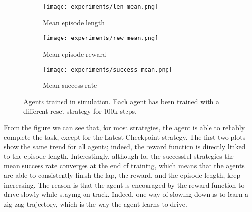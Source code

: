 \begin{figure}[h]
  \centering
  \begin{subfigure}{.45\linewidth}
      \centering
      \texttt{[image: experiments/len\_mean.png]}
      \caption{Mean episode length}\label{fig:len}
  \end{subfigure}%
      \hfill
  \begin{subfigure}{.45\linewidth}
      \centering
      \texttt{[image: experiments/rew\_mean.png]}
      \caption{Mean episode reward}\label{fig:rew}
  \end{subfigure}
  
  \bigskip
  \begin{subfigure}{.45\linewidth}
    \centering
    \texttt{[image: experiments/success\_mean.png]}
    \caption{Mean success rate}\label{fig:succ}
  \end{subfigure} 
  \caption{Agents trained in simulation. Each agent has been trained with a different reset strategy for 100k steps.}
  \label{fig:agentresults}
\end{figure}


From the figure we can see that, for most strategies, the agent is able to reliably complete the task, except for the Latest Checkpoint strategy. The first two plots show the same trend for all agents; indeed, the reward function is directly linked to the episode length. Interestingly, although for the successful strategies the mean success rate converges at the end of training, which means that the agents are able to consistently finish the lap, the reward, and the episode length, keep increasing. The reason is that the agent is encouraged by the reward function to drive slowly while staying on track. Indeed, one way of slowing down is to learn a zig-zag trajectory, which is the way the agent learns to drive. 

